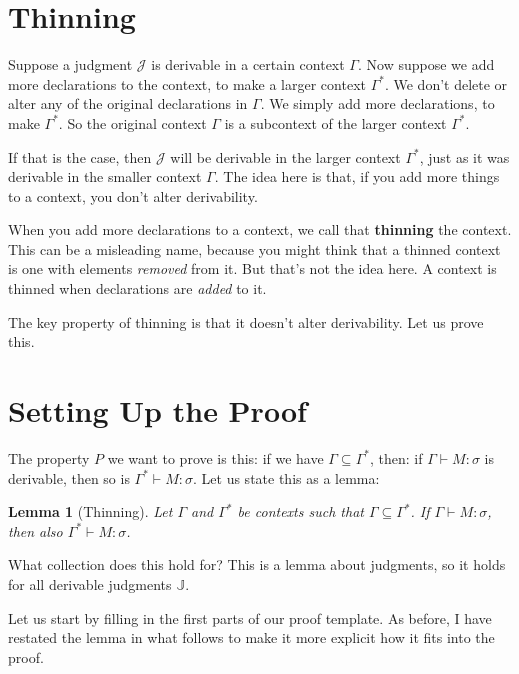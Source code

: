 \documentclass{book}
\numberwithin{equation}{chapter}
\newcommand{\vocab}{\textbf}
\newtheorem{lemma}{Lemma}
\begin{document}
\section{Thinning}

Suppose a judgment $\mathcal{J}$ is derivable in a certain context $\Gamma$. Now suppose we add more declarations to the context, to make a larger context $\Gamma^{*}$. We don't delete or alter any of the original declarations in $\Gamma$. We simply add more declarations, to make $\Gamma^{*}$. So the original context $\Gamma$ is a subcontext of the larger context $\Gamma^{*}$.

If that is the case, then $\mathcal{J}$ will be derivable in the larger context $\Gamma^{*}$, just as it was derivable in the smaller context $\Gamma$. The idea here is that, if you add more things to a context, you don't alter derivability. 

When you add more declarations to a context, we call that \vocab{thinning} the context. This can be a misleading name, because you might think that a thinned context is one with elements \textit{removed} from it. But that's not the idea here. A context is thinned when declarations are \textit{added} to it.

The key property of thinning is that it doesn't alter derivability. Let us prove this.


\section{Setting Up the Proof}

The property $P$ we want to prove is this: if we have $\Gamma \subseteq \Gamma^{*}$, then: if $\Gamma \vdash M : \sigma$ is derivable, then so is $\Gamma^{*} \vdash M : \sigma$. Let us state this as a lemma:

\begin{lemma}[Thinning]
Let $\Gamma$ and $\Gamma^{*}$ be contexts such that $\Gamma \subseteq \Gamma^{*}$. If $\Gamma \vdash M : \sigma$, then also $\Gamma^{*} \vdash M : \sigma$.
\end{lemma}

\noindent
What collection does this hold for? This is a lemma about judgments, so it holds for all derivable judgments $\mathbb{J}$.

Let us start by filling in the first parts of our proof template. As before, I have restated the lemma in what follows to make it more explicit how it fits into the proof. 
\end{document}
